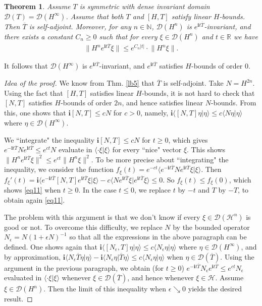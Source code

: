 \documentclass[12pt,a4paper,notitlepage]{article}
\theoremstyle{definition}
\theoremstyle{plain}
\newtheorem{thm}[df]{Theorem}
\newcommand{\mc}{\mathcal}
\newcommand{\ovl}{\overline}
\newcommand{\Dom}{\scr D}
\newcommand{\bk}[1]{\langle {#1}\rangle}
\newcommand{\scr}{\mathscr}
\newcommand{\im}{\mathbf{i}}
\newcommand{\Nbb}{\mathbb N}
\newcommand{\Rbb}{\mathbb R}
\numberwithin{equation}{subsection}
\begin{document}
\begin{thm}\label{lb9}
Assume $T$ is symmetric with dense invariant domain $\Dom(T)=\Dom(H^\infty)$. Assume that both $T$ and $[H,T]$ satisfy linear $H$-bounds. Then $\ovl T$ is self-adjoint. Moreover,  for any $n\in\Nbb$, $\Dom(H^n)$ is $e^{\im t\ovl T}$-invariant, and there exists a constant $C_n\geq 0$ such that for every  $\xi\in\Dom(H^n)$ and $t\in\Rbb$ we have
\begin{align}
\lVert H^n e^{\im t\ovl T}\xi\lVert\leq e^{C_n|t|}\cdot \lVert H^n\xi\lVert.	\label{eq11}
\end{align}
\end{thm}

It follows that $\Dom(H^\infty)$ is $e^{\im t\ovl T}$-invariant, and $e^{\im t\ovl T}$ satisfies $H$-bounds of order $0$.


\begin{proof}[Idea of the proof]
We know from Thm. \ref{lb5} that $\ovl T$ is self-adjoint. Take $N=H^{2n}$. Using the fact that $[H,T]$ satisfies linear $H$-bounds, it is not hard to check that $[N,T]$ satisfies $H$-bounds of order $2n$, and hence satisfies linear $N$-bounds. From this, one shows that $\im[N,T]\leq cN$ for $c>0$, namely, $\im\bk{[N,T]\eta|\eta}\leq c\bk{N\eta|\eta}$ where $\eta\in\Dom(H^\infty)$.

We ``integrate" the inequality $\im[N,T]\leq cN$ for $t\geq 0$, which gives $e^{-\im t\ovl T}Ne^{\im t\ovl T}\leq e^{ct}N$ evaluate in $\bk{\cdot \xi|\xi}$ for every ``nice" vector $\xi$. This shows $\lVert H^ne^{\im t\ovl T}\xi\lVert^2\leq e^{ct}\lVert H^n\xi\lVert^2$. To be more precise about ``integrating" the inequality, we consider the function $f_\xi(t)=e^{-ct}\bk{e^{-\im t\ovl T}Ne^{\im t\ovl T}\xi|\xi}$. Then $f_\xi'(t)=\im\bk{e^{-\im t\ovl T}[N,T]e^{\im t\ovl T}\xi|\xi}- c\bk{Ne^{\im t\ovl T}\xi|e^{\im t\ovl T}\xi}\leq 0$. So $f_\xi(t)\leq f_\xi(0)$, which shows \eqref{eq11} when $t\geq 0$. In the case $t\leq 0$, we replace $t$ by $-t$ and $T$ by $-T$, to obtain again \eqref{eq11}.

The problem with this argument is that we don't know if every $\xi\in\Dom(\mc H^n)$ is good or not. To overcome this difficulty, we replace $N$ by the bounded operator $N_\epsilon=N(1+\epsilon N)^{-1}$ so that all the expressions in the above paragraph can be defined. One shows again that $\im\bk{[N_\epsilon,T]\eta|\eta}\leq c\bk{N_\epsilon\eta|\eta}$ where $\eta\in\Dom(H^\infty)$, and by approximation, $\im\bk{N_\epsilon \ovl T\eta|\eta}-\im\bk{N_\epsilon\eta|\ovl T\eta}\leq c\bk{N_\epsilon\eta|\eta}$ when $\eta\in\Dom(\ovl T)$. Using the argument in the previous paragraph, we obtain (for $t\geq 0$) $e^{-\im t\ovl T}N_\epsilon e^{\im t\ovl T}\leq e^{ct}N_\epsilon$  evaluated in $\bk{\cdot \xi|\xi}$ whenever $\xi\in\Dom(\ovl T)$, and hence whenever $\xi\in\mc H$. Assume $\xi\in\Dom(H^n)$.  Then the limit of this inequality when $\epsilon\searrow0$ yields the desired result.
\end{proof}
\end{document}
